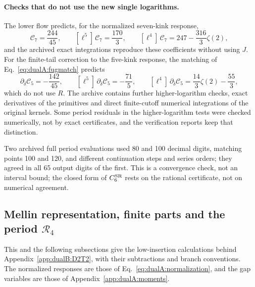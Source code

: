 \documentclass[11pt,a4paper]{article}
\numberwithin{equation}{section}
\newcommand{\CSR}{C^{\rm SR}}
\newcommand{\db}{\bar\delta}
\begin{document}
\paragraph{Checks that do not use the new single logarithms.} The lower flow predicts, for the normalized seven-kink
response,
\begin{equation}
 [\ell^6]\,\mathcal C_7=\frac{244}{45},\qquad [\ell^5]\,\mathcal C_7=\frac{170}{3},\qquad
 [\ell^4]\,\mathcal C_7=247-\frac{316}{3}\zeta(2),
\end{equation}
and the archived exact integrations reproduce these coefficients without using $J$. For the finite-tail correction
to the five-kink response, the matching of Eq.~\eqref{eq:dualA:fugmatch} predicts
\begin{equation}
 [\ell^6]\,\partial_{\db}\mathcal C_5=-\frac{142}{45},\qquad [\ell^5]\,\partial_{\db}\mathcal C_5=-\frac{71}{5},\qquad
 [\ell^4]\,\partial_{\db}\mathcal C_5=\frac{14}{3}\zeta(2)-\frac{55}{3},
\end{equation}
which do not use $R$. The archive contains further higher-logarithm checks, exact derivatives of the primitives and
direct finite-cutoff numerical integrations of the original kernels. Some period residuals in the higher-logarithm
tests were checked numerically, not by exact certificates, and the verification reports keep that distinction.

Two archived full period evaluations used 80 and 100 decimal digits, matching points 100 and 120, and different
continuation steps and series orders; they agreed in all 65 output digits of the first. This is a convergence
check, not an interval bound; the closed form of $\CSR_6$ rests on the rational certificate, not on numerical
agreement.

\subsection{Mellin representation, finite parts and the period \texorpdfstring{$\mathcal R_4$}{R4}}\label{app:dualB:worked}
This and the following subsections give the low-insertion calculations behind Appendix~\ref{app:dualB:D2T2}, with
their subtractions and branch conventions. The normalized responses are those of
Eq.~\eqref{eq:dualA:normalization}, and the gap variables are those of Appendix~\ref{app:dualA:moments}.
\end{document}
